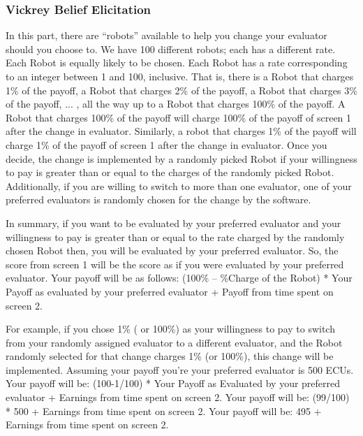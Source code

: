 \subsubsection{Vickrey Belief Elicitation}
\newline
In this part, there are “robots” available to help you change your evaluator should you choose to. We have 100 different robots; each has a different rate. Each Robot is equally likely to be chosen. Each Robot has a rate corresponding to an integer between 1 and 100, inclusive. That is, there is a Robot that charges 1\% of the payoff, a Robot that charges 2\% of the payoff, a Robot that charges 3\% of the payoff, ... , all the way up to a Robot that charges 100\% of the payoff. A Robot that charges 100\% of the payoff will charge 100\% of the payoff of screen 1 after the change in evaluator. Similarly, a robot that charges 1\% of the payoff will charge 1\% of the payoff of screen 1 after the change in evaluator. 
Once you decide, the change is implemented by a randomly picked Robot if your willingness to pay is greater than or equal to the charges of the randomly picked Robot. Additionally, if you are willing to switch to more than one evaluator, one of your preferred evaluators is randomly chosen for the change by the software. 


In summary, if you want to be evaluated by your preferred evaluator and your willingness to pay is greater than or equal to the rate charged by the randomly chosen Robot then, you will be evaluated by your preferred evaluator.  So, the score from screen 1 will be the score as if you were evaluated by your preferred evaluator.
 Your payoff will be as follows: (100\% – \%Charge of the Robot) * Your Payoff as evaluated by your preferred evaluator + Payoff from time spent on screen 2. 
 
 
For example, if you chose 1\% ( or 100\%) as your willingness to pay to switch from your randomly assigned evaluator to a different evaluator, and the Robot randomly selected for that change charges 1\% (or 100\%), this change will be implemented. Assuming your payoff you’re your preferred evaluator is 500 ECUs. 
Your payoff will be: (100-1/100) * Your Payoff as Evaluated by your preferred evaluator + Earnings from time spent on screen 2.
Your payoff will be: (99/100) * 500 + Earnings from time spent on screen 2. 
Your payoff will be: 495 + Earnings from time spent on screen 2. 

